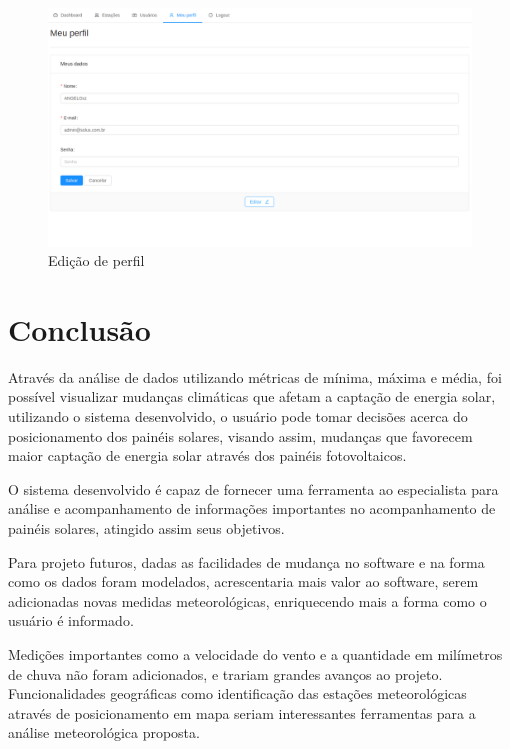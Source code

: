 \begin{figure}[H]
    \centering
    \caption{Edição de perfil \label{fig:perfil_edit}}
    \includegraphics[scale=0.3]{telas/perfil_edit.png}
    \hfill
{}
\end{figure}


\chapter{Conclusão}

Através da análise de dados utilizando métricas de mínima, máxima e média, foi possível visualizar mudanças climáticas que afetam a captação de energia solar, utilizando o sistema desenvolvido, o usuário pode tomar decisões acerca do posicionamento dos painéis solares, visando assim, mudanças que favorecem maior captação de energia solar através dos painéis fotovoltaicos.

O sistema desenvolvido é capaz de fornecer uma ferramenta ao especialista para análise e acompanhamento de informações importantes no acompanhamento de painéis solares, atingido assim seus objetivos.

Para projeto futuros, dadas as facilidades de mudança no software e na forma como os dados foram modelados, acrescentaria mais valor ao software, serem adicionadas novas medidas meteorológicas, enriquecendo mais a forma como o usuário é informado.

Medições importantes como a velocidade do vento e a quantidade em milímetros de chuva não foram adicionados, e trariam grandes avanços ao projeto. Funcionalidades geográficas como identificação das estações meteorológicas através de posicionamento em mapa seriam interessantes ferramentas para a análise meteorológica proposta.
